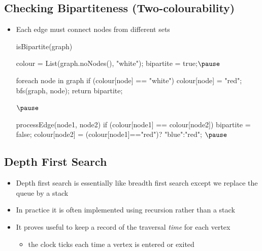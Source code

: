 
\begin{slide}
\section[-2]{Checking Bipartiteness (Two-colourability)}

\begin{PauseHighLight}
  \begin{itemize}
  \item Each edge must connect nodes from different sets\pause
    \begin{java}
    isBipartite(graph) {
       colour = List(graph.noNodes(), "white");
       bipartite = true;$\pause$

       foreach node in graph {
          if (colour[node] == "white") {
             colour[node] = "red";
             bfs(graph, node);
          }
       }
       return bipartite;
    }$\pause$

    processEdge(node1, node2) {
       if (colour[node1] == colour[node2])
           bipartite = false;
       colour[node2] = (colour[node1]=="red")? "blue":"red";
    }$\pause$
    \end{java}
  \end{itemize}
\end{PauseHighLight}

\end{slide}

\Outline %

\begin{slide}
\section{Depth First Search}

\begin{PauseHighLight}
  \begin{itemize}
  \item Depth first search is essentially like breadth first search
    except we replace the queue by a stack\pause
  \item In practice it is often implemented using recursion rather than
    a stack\pause
  \item It proves useful to keep a record of the traversal \emph{time}
    for each vertex
    \begin{itemize}
    \item the clock ticks each time a vertex is entered or exited\pause
    \end{itemize}
  \end{itemize}
\end{PauseHighLight}


\end{slide}

